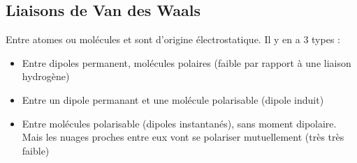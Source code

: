 \documentclass[french]{yLectureNote}
\begin{document}
\subsection{Liaisons de Van des Waals}
Entre atomes ou molécules et sont d'origine électrostatique. Il y en a 3 types :
\begin{itemize}
 \item Entre dipoles permanent, molécules polaires (faible par rapport à une liaison hydrogène)
 \item Entre un dipole permanant et une molécule polarisable (dipole induit)
 \item Entre molécules polarisable (dipoles instantanés), sans moment dipolaire. Mais les nuages proches entre eux vont se polariser mutuellement (très très faible)
\end{itemize}
\end{document}
